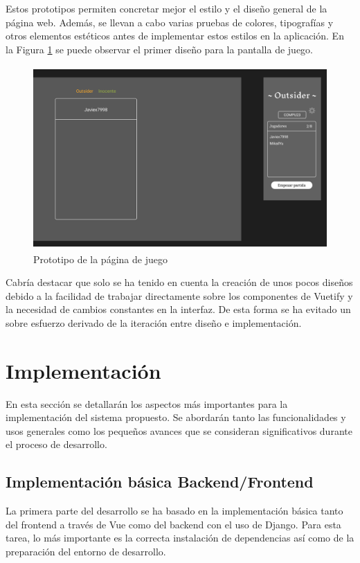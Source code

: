 Estos prototipos permiten concretar mejor el estilo y el diseño general de la página web. Además, 
se llevan a cabo varias pruebas de colores, tipografías y otros elementos estéticos antes de 
implementar estos estilos en la aplicación. En la Figura \ref{fig:res_designJuego} se puede observar el primer diseño para la pantalla
de juego.

\begin{figure}[h]
	\centering
	\includegraphics[height=7cm]{res_designJuego.png}
	\caption{Prototipo de la página de juego}
	\label{fig:res_designJuego}
\end{figure}

Cabría destacar que solo se ha tenido en cuenta la creación de unos pocos diseños debido a la facilidad de trabajar directamente
sobre los componentes de Vuetify y la necesidad de cambios constantes en la interfaz. De esta forma se ha evitado un 
sobre esfuerzo derivado de la iteración entre diseño e implementación.

\section{Implementación}

En esta sección se detallarán los aspectos más importantes para la implementación del sistema propuesto. 
Se abordarán tanto las funcionalidades y usos generales como los pequeños avances que se consideran significativos 
durante el proceso de desarrollo.

\subsection{Implementación básica Backend/Frontend}

La primera parte del desarrollo se ha basado en la implementación básica tanto del frontend a través de Vue como del 
backend con el uso de Django. Para esta tarea, lo más importante es la correcta instalación de dependencias así como de
la preparación del entorno de desarrollo.


